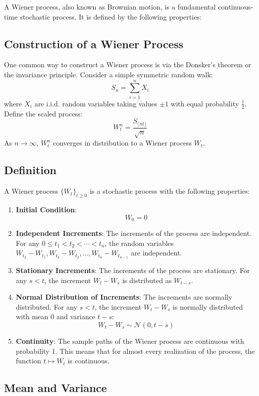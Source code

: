 \documentclass[12pt]{article}
\begin{document}
A Wiener process, also known as Brownian motion, is a fundamental continuous-time stochastic process. It is defined by the following properties:

\subsection{Construction of a Wiener Process}
One common way to construct a Wiener process is via the Donsker's theorem or the invariance principle. Consider a simple symmetric random walk:
\[
S_n = \sum_{i=1}^n X_i
\]
where \( X_i \) are i.i.d. random variables taking values \( \pm 1 \) with equal probability \( \frac{1}{2} \). Define the scaled process:
\[
W_t^n = \frac{S_{\lfloor nt \rfloor}}{\sqrt{n}}
\]
As \( n \to \infty \), \( W_t^n \) converges in distribution to a Wiener process \( W_t \).

\subsection{Definition}

A Wiener process \( \{W_t\}_{t \geq 0} \) is a stochastic process with the following properties:

\begin{enumerate}
    \item \textbf{Initial Condition}:
    \[
    W_0 = 0
    \]
    \item \textbf{Independent Increments}:
    The increments of the process are independent. For any \( 0 \leq t_1 < t_2 < \cdots < t_n \), the random variables \( W_{t_2} - W_{t_1}, W_{t_3} - W_{t_2}, \ldots, W_{t_n} - W_{t_{n-1}} \) are independent.
    \item \textbf{Stationary Increments}:
    The increments of the process are stationary. For any \( s < t \), the increment \( W_t - W_s \) is distributed as \( W_{t-s} \).
    \item \textbf{Normal Distribution of Increments}:
    The increments are normally distributed. For any \( s < t \), the increment \( W_t - W_s \) is normally distributed with mean 0 and variance \( t - s \):
    \[
    W_t - W_s \sim \mathcal{N}(0, t - s)
    \]
    \item \textbf{Continuity}:
    The sample paths of the Wiener process are continuous with probability 1. This means that for almost every realization of the process, the function \( t \mapsto W_t \) is continuous.
\end{enumerate}

\subsection{Mean and Variance}
\end{document}
